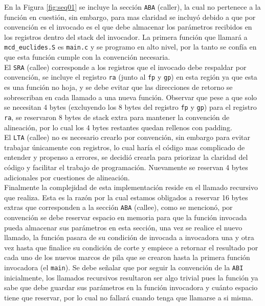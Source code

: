 \documentclass[titlepage,a4paper]{article}
\begin{document}
En la Figura \ref{fig:seq01} se incluye la sección \verb|ABA| (caller), la cual no pertenece a la función en cuestión, sin embargo, para mas claridad se incluyó debido a que por convención es el invocado es el que debe almacenar los parámetros recibidos en los registros dentro del stack del invocador. La primera función que llamará a \verb|mcd_euclides.S| es \verb|main.c| y se programo en alto nivel, por la tanto se confía en que esta función cumple con la convención necesaria. \\


El \verb|SRA| (callee) corresponde a los registros que el invocado debe respaldar por convención,  se incluye el registro \verb|ra| (junto al \verb|fp| y \verb|gp|) en esta región ya que esta es una función no hoja, y se debe evitar que las direcciones de retorno se sobrescriban en cada llamado a una nueva función. Observar que pese a que solo se necesitan 4 bytes (excluyendo los 8 bytes del registro \verb|fp| y \verb|gp|) para el registro \verb|ra|, se reservaron 8 bytes de stack extra para mantener la convención de alineación, por lo cual los 4 bytes restantes quedan rellenos con padding.\\

El \verb|LTA| (callee) no es necesario crearlo por convención, sin embargo para evitar trabajar únicamente con registros, lo cual haría el código mas complicado de entender y propenso a errores, se decidió crearla para priorizar la claridad del código y facilitar el trabajo de programación. Nuevamente se reservan 4 bytes adicionales por cuestiones de alineación.\\
	
Finalmente la complejidad de esta implementación reside en el llamado recursivo que realiza. Esta es la razón por la cual estamos obligados a reservar 16 bytes extras que corresponden a la sección \verb|ABA| (callee), como se mencionó, por convención se debe reservar espacio en memoria para que la función invocada pueda almacenar sus parámetros en esta sección, una vez se realice el nuevo llamado, la función pasara de su condición de invocada a invocadora una y otra vez hasta que finalice su condición de corte y empiece a retornar el resultado por cada uno de los nuevos marcos de pila que se crearon hasta la primera función invocadora (el \verb|main|). Se debe señalar que por seguir la convención de la \verb|ABI| inicialmente, los llamados recursivos resultaron ser algo trivial pues la función ya sabe que debe guardar sus parámetros en la función invocadora y cuánto espacio tiene que reservar, por lo cual no fallará cuando tenga que llamarse a si misma.\\
\end{document}
